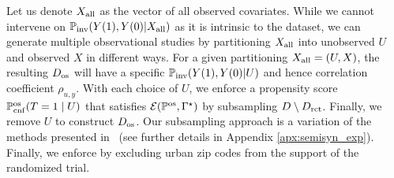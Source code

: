 Let us denote $X_{\mathrm{all}}$ as the vector of all observed covariates. While we cannot intervene on $\mathbb{P} _{\operatorname{inv}} (Y(1), Y(0)|X_{\mathrm{all}})$ as it is intrinsic to the dataset, we can generate multiple observational studies by partitioning $X_{\mathrm{all}}$ into unobserved $U$ and observed $X$ in different ways.
For a given partitioning $X_{\mathrm{all}} = (U,X)$, the resulting $D_{\mathrm{os}}$ will have a specific  $\mathbb{P} _{\operatorname{inv}} (Y(1), Y(0)|U)$  and hence correlation coefficient $\rho_{u,y}$. With each choice of $U$, we enforce a propensity score $\mathbb{P}_{\operatorname{cnf}}^{\operatorname{os}}(T=1 \mid U)$ that satisfies $\mathcal{E}(\mathbb{P}^{\operatorname{os}}, \Gamma^{\star})$
by subsampling $D \setminus D_{\operatorname{rct}}$. Finally, we remove $U$ to construct $D_{\mathrm{os}}$. Our subsampling approach is a variation of the methods presented in~\citet{keith2023rct, gentzel2021and} (see further details in Appendix \ref{apx:semisyn_exp}). Finally, we enforce  by excluding urban zip codes from the support of the randomized trial.

